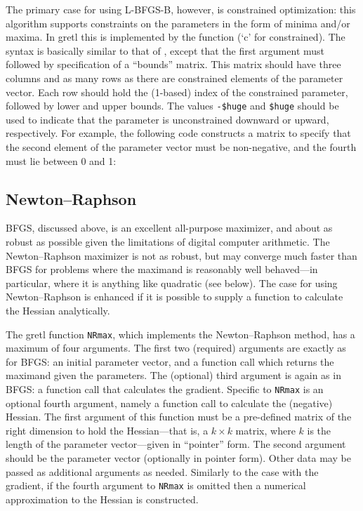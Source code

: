 The primary case for using \textsf{L-BFGS-B}, however, is constrained
optimization: this algorithm supports constraints on the parameters in
the form of minima and/or maxima. In gretl this is implemented by the
function  (`c' for constrained). The syntax is basically
similar to that of , except that the first argument must
followed by specification of a ``bounds'' matrix. This matrix should
have three columns and as many rows as there are constrained elements
of the parameter vector. Each row should hold the (1-based) index of
the constrained parameter, followed by lower and upper bounds. The
values \verb|-$huge| and \verb|$huge| should be used to indicate that
the parameter is unconstrained downward or upward, respectively. For
example, the following code constructs a matrix to specify that the
second element of the parameter vector must be non-negative, and the
fourth must lie between 0 and 1:
%

\subsection{Newton--Raphson}
\label{sec:newton-raphson}

BFGS, discussed above, is an excellent all-purpose maximizer, and
about as robust as possible given the limitations of digital computer
arithmetic. The Newton--Raphson maximizer is not as robust, but may
converge much faster than BFGS for problems where the maximand is
reasonably well behaved---in particular, where it is anything like
quadratic (see below). The case for using Newton--Raphson is enhanced
if it is possible to supply a function to calculate the Hessian
analytically.

The gretl function \texttt{NRmax}, which implements the
Newton--Raphson method, has a maximum of four arguments. The first two
(required) arguments are exactly as for BFGS: an initial parameter
vector, and a function call which returns the maximand given the
parameters. The (optional) third argument is again as in BFGS: a
function call that calculates the gradient. Specific to \texttt{NRmax}
is an optional fourth argument, namely a function call to calculate
the (negative) Hessian. The first argument of this function must be a
pre-defined matrix of the right dimension to hold the Hessian---that
is, a $k \times k$ matrix, where $k$ is the length of the parameter
vector---given in ``pointer'' form. The second argument should be
the parameter vector (optionally in pointer form). Other data may be
passed as additional arguments as needed. Similarly to the case with
the gradient, if the fourth argument to \texttt{NRmax} is omitted then
a numerical approximation to the Hessian is constructed.


